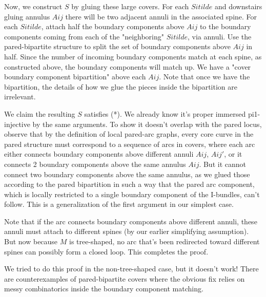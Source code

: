 \documentclass[12pt]{amsart}
\theoremstyle{definition}
\begin{document}
Now, we construct $S$ by gluing these large covers. For each $Sitilde$ and
downstairs gluing annulus $Aij$ there will be two adjacent annuli in the
associated spine. For each $Sitilde$, attach half the boundary components above
$Aij$ to the boundary components coming from each of the "neighboring"
$Sitilde$,
via annuli. Use the pared-bipartite structure to split the set of boundary
components above $Aij$ in half. Since the number of incoming boundary components
match at each spine, as constructed above, the boundary components will match
up. We have a "cover boundary component bipartition" above each $Aij$. Note that
once we have the bipartition, the details of how we glue the pieces inside the
bipartition are irrelevant.

We claim the resulting $S$ satisfies (*). We already know it's proper immersed
pi1-injective by the same arguments. To show it doesn't overlap with the pared
locus, observe that by the definition of local pared-arc graphs, every core
curve in the pared structure must correspond to a sequence of arcs in covers,
where each arc either connects boundary components above different annuli $Aij$,
$Aij'$, or it connects 2 boundary components above the same annulus $Aij$. But it
cannot connect two boundary components above the same annulus, as we glued
those according to the pared bipartition in such a way that the pared arc
component, which is locally restricted to a single boundary component of the
I-bundles, can't follow. This is a generalization of the first argument in our
simplest case.

Note that if the arc connects boundary components above different annuli, these
annuli must attach to different spines (by our earlier simplifying assumption).
But now because $M$ is tree-shaped, no arc that's been redirected toward
different spines can possibly form a closed loop. This completes the proof.

We tried to do this proof in the non-tree-shaped case, but it doesn't work!
There are counterexamples of pared-bipartite covers where the obvious fix
relies on messy combinatorics inside the boundary component matching.
\end{document}
